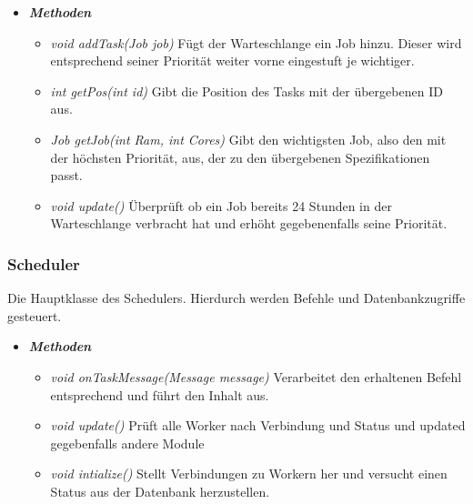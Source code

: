 \documentclass[a4paper,12pt]{article}
\begin{document}
\begin{itemize}[label={}]

\item \textit{\textbf{Methoden}}
\begin{itemize}[label={\textbullet}]

\item \textit{void addTask(Job job)} Fügt der Warteschlange ein Job hinzu. Dieser wird entsprechend seiner Priorität weiter vorne eingestuft je wichtiger.

\item \textit{int getPos(int id)} Gibt die Position des Tasks mit der übergebenen ID aus.

\item \textit{Job getJob(int Ram, int Cores)} Gibt den wichtigsten Job, also den mit der höchsten Priorität,  aus, der zu den übergebenen Spezifikationen passt.

\item \textit{void update()} Überprüft ob ein Job bereits 24 Stunden in der Warteschlange verbracht hat und erhöht gegebenenfalls seine Priorität.

\end{itemize}

\end{itemize}

\subsubsection{Scheduler}

Die Hauptklasse des Schedulers. Hierdurch werden Befehle und Datenbankzugriffe gesteuert.
\begin{itemize}[label={}]
	
	\item \textit{\textbf{Methoden}}
	\begin{itemize}[label={\textbullet}]
		
		\item \textit{void onTaskMessage(Message message)} Verarbeitet den erhaltenen Befehl entsprechend und führt den Inhalt aus.
		
		\item \textit{void update()} Prüft alle Worker nach Verbindung und Status und updated gegebenfalls andere Module
		
		\item \textit{void intialize()} Stellt Verbindungen zu Workern her und versucht einen Status aus der Datenbank herzustellen. 
		
	\end{itemize}
	
\end{itemize}
\end{document}
